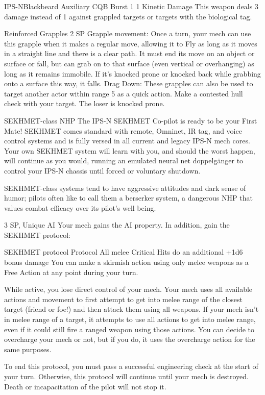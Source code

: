 \begin{mech}{IPS-N}{Blackbeard}
Auxiliary CQB
Burst 1
1 Kinetic Damage
This weapon deals 3 damage instead of 1 against grappled targets or targets with the biological tag.

Reinforced Grapples
2 SP
Grapple movement: Once a turn, your mech can use this grapple when it makes a regular move, allowing it to Fly as long as it moves in a straight line and there is a clear path. It must end its move on an object or surface or fall, but can grab on to that surface (even vertical or overhanging) as long as it remains immobile. If it’s knocked prone or knocked back while grabbing onto a surface this way, it falls.
Drag Down: These grapples can also be used to target another actor within range 5 as a quick action. Make a contested hull check with your target. The loser is knocked prone.

SEKHMET-class NHP
The IPS-N SEKHMET Co-pilot is ready to be your First Mate! SEKHMET comes standard with remote, Omninet, IR tag, and voice control systems and is fully versed in all current and legacy IPS-N mech cores. Your own SEKHMET system will learn with you, and should the worst happen, will continue as you would, running an emulated neural net doppelgänger to control your IPS-N chassis until forced or voluntary shutdown. 

SEKHMET-class systems tend to have aggressive attitudes and dark sense of humor; pilots often like to call them a berserker system, a dangerous NHP that values combat efficacy over its pilot’s well being.

3 SP, Unique
AI
Your mech gains the AI property. In addition, gain the SEKHMET protocol:

SEKHMET protocol
Protocol
All melee Critical Hits do an additional +1d6 bonus damage
You can make a skirmish action using only melee weapons as a Free Action at any point during your turn.

While active, you lose direct control of your mech. Your mech uses all available actions and movement to first attempt to get into melee range of the closest target (friend or foe!) and then attack them using all weapons. If your mech isn’t in melee range of a target, it attempts to use all actions to get into melee range, even if it could still fire a ranged weapon using those actions. You can decide to overcharge your mech or not, but if you do, it uses the overcharge action for the same purposes.

To end this protocol, you must pass a successful engineering check at the start of your turn. Otherwise, this protocol will continue until your mech is destroyed. Death or incapacitation of the pilot will not stop it.


\end{mech}
